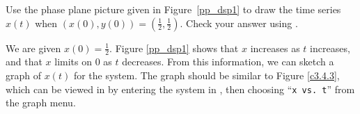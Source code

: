 \documentclass{ximera}
\begin{document}
\begin{exercise} \label{c3.4.3}
Use the phase plane picture given in Figure~\ref{pp_dsp1} to
draw the time series $x(t)$ when $(x(0),y(0)) =
\left(\frac{1}{2},\frac{1}{2}\right)$.  Check your answer using {\pplane}.

\begin{solution}

We are given $x(0) = \frac{1}{2}$.  Figure \ref{pp_dsp1}
shows that $x$ increases as $t$
increases, and that $x$ limits on $0$ as $t$ decreases.  From
this information, we can sketch a graph of $x(t)$ for the system.
The graph should be similar to Figure \ref{c3.4.3}, which can
be viewed in \Matlab by entering the system in {\pplane},
then choosing ``{\tt x vs.\ t}'' from the graph menu.

\begin{figure}[htb]
                       \centerline{%
                       }
\end{figure}

\end{solution}
\end{exercise}
\end{document}
